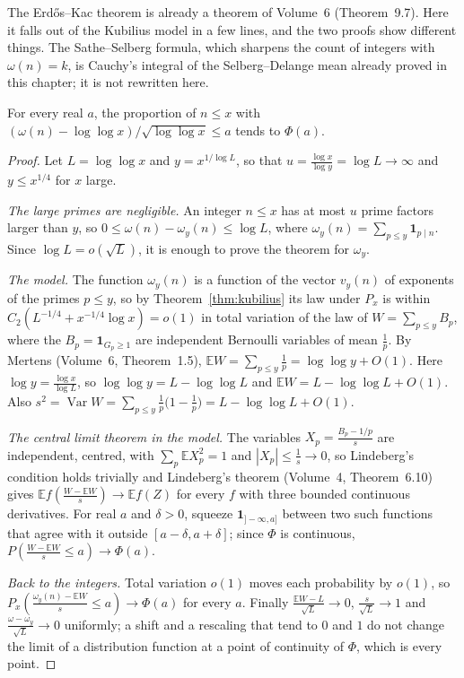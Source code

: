 The Erd\H os--Kac theorem is already a theorem of Volume~6 (Theorem~9.7). Here it falls out of the Kubilius model in a few lines, and the two proofs show different things. The Sathe--Selberg formula, which sharpens the count of integers with $\omega(n)=k$, is Cauchy's integral of the Selberg--Delange mean already proved in this chapter; it is not rewritten here.

\begin{theorem}\label{thm:erdoskac-cor}
For every real $a$, the proportion of $n\le x$ with $(\omega(n)-\log\log x)/\sqrt{\log\log x}\le a$ tends to $\Phi(a)$.
\end{theorem}
\begin{proof}
Let $L=\log\log x$ and $y=x^{1/\log L}$, so that $u=\frac{\log x}{\log y}=\log L\to\infty$ and $y\le x^{1/4}$ for $x$ large.

\emph{The large primes are negligible.} An integer $n\le x$ has at most $u$ prime factors larger than $y$, so $0\le\omega(n)-\omega_y(n)\le\log L$, where $\omega_y(n)=\sum_{p\le y}\mathbf 1_{p\mid n}$. Since $\log L=o(\sqrt L)$, it is enough to prove the theorem for $\omega_y$.

\emph{The model.} The function $\omega_y(n)$ is a function of the vector $v_y(n)$ of exponents of the primes $p\le y$, so by Theorem~\ref{thm:kubilius} its law under $P_x$ is within $C_2(L^{-1/4}+x^{-1/4}\log x)=o(1)$ in total variation of the law of $W=\sum_{p\le y}B_p$, where the $B_p=\mathbf 1_{G_p\ge1}$ are independent Bernoulli variables of mean $\frac1p$. By Mertens (Volume~6, Theorem~1.5), $\mathbb EW=\sum_{p\le y}\frac1p=\log\log y+O(1)$. Here $\log y=\frac{\log x}{\log L}$, so $\log\log y=L-\log\log L$ and $\mathbb EW=L-\log\log L+O(1)$. Also $s^2=\operatorname{Var}W=\sum_{p\le y}\frac1p\bigl(1-\frac1p\bigr)=L-\log\log L+O(1)$.

\emph{The central limit theorem in the model.} The variables $X_p=\frac{B_p-1/p}{s}$ are independent, centred, with $\sum_p\mathbb EX_p^2=1$ and $|X_p|\le\frac1s\to0$, so Lindeberg's condition holds trivially and Lindeberg's theorem (Volume~4, Theorem~6.10) gives $\mathbb Ef(\frac{W-\mathbb EW}s)\to\mathbb Ef(Z)$ for every $f$ with three bounded continuous derivatives. For real $a$ and $\delta>0$, squeeze $\mathbf 1_{]-\infty,a]}$ between two such functions that agree with it outside $[a-\delta,a+\delta]$; since $\Phi$ is continuous, $P(\frac{W-\mathbb EW}s\le a)\to\Phi(a)$.

\emph{Back to the integers.} Total variation $o(1)$ moves each probability by $o(1)$, so $P_x(\frac{\omega_y(n)-\mathbb EW}s\le a)\to\Phi(a)$ for every $a$. Finally $\frac{\mathbb EW-L}{\sqrt L}\to0$, $\frac s{\sqrt L}\to1$ and $\frac{\omega-\omega_y}{\sqrt L}\to0$ uniformly; a shift and a rescaling that tend to $0$ and $1$ do not change the limit of a distribution function at a point of continuity of $\Phi$, which is every point.
\end{proof}

